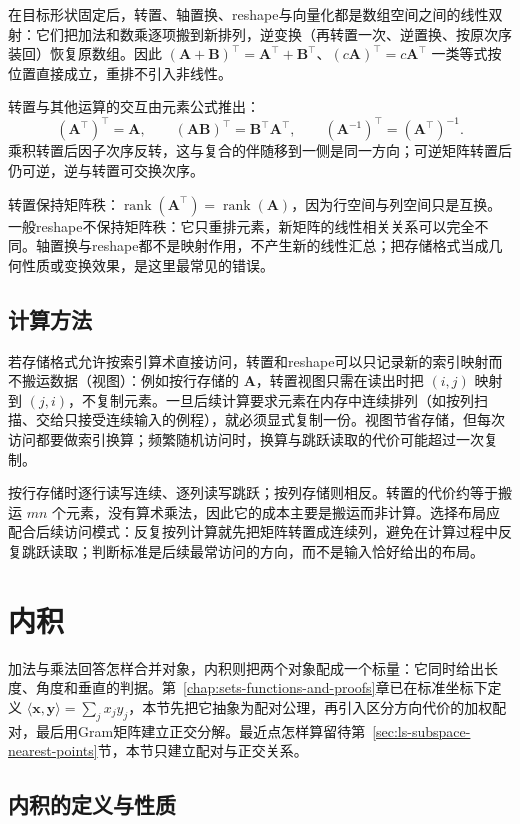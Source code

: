 在目标形状固定后，转置、轴置换、reshape与向量化都是数组空间之间的线性双射：它们把加法和数乘逐项搬到新排列，逆变换（再转置一次、逆置换、按原次序装回）恢复原数组。因此 $(\bm A+\bm B)^\top=\bm A^\top+\bm B^\top$、$(c\bm A)^\top=c\bm A^\top$ 一类等式按位置直接成立，重排不引入非线性。

转置与其他运算的交互由元素公式推出：
\[
 (\bm A^\top)^\top=\bm A,\qquad
 (\bm A\bm B)^\top=\bm B^\top\bm A^\top,\qquad
 (\bm A^{-1})^\top=(\bm A^\top)^{-1}.
\]
乘积转置后因子次序反转，这与复合的伴随移到一侧是同一方向；可逆矩阵转置后仍可逆，逆与转置可交换次序。

转置保持矩阵秩：$\operatorname{rank}(\bm A^\top)=\operatorname{rank}(\bm A)$，因为行空间与列空间只是互换。一般reshape不保持矩阵秩：它只重排元素，新矩阵的线性相关关系可以完全不同。轴置换与reshape都不是映射作用，不产生新的线性汇总；把存储格式当成几何性质或变换效果，是这里最常见的错误。

\subsection{计算方法}

若存储格式允许按索引算术直接访问，转置和reshape可以只记录新的索引映射而不搬运数据（视图）：例如按行存储的 $\bm A$，转置视图只需在读出时把 $(i,j)$ 映射到 $(j,i)$，不复制元素。一旦后续计算要求元素在内存中连续排列（如按列扫描、交给只接受连续输入的例程），就必须显式复制一份。视图节省存储，但每次访问都要做索引换算；频繁随机访问时，换算与跳跃读取的代价可能超过一次复制。

按行存储时逐行读写连续、逐列读写跳跃；按列存储则相反。转置的代价约等于搬运 $mn$ 个元素，没有算术乘法，因此它的成本主要是搬运而非计算。选择布局应配合后续访问模式：反复按列计算就先把矩阵转置成连续列，避免在计算过程中反复跳跃读取；判断标准是后续最常访问的方向，而不是输入恰好给出的布局。

\section{内积}
\label{sec:ls-inner-products}

加法与乘法回答怎样合并对象，内积则把两个对象配成一个标量：它同时给出长度、角度和垂直的判据。第~\ref{chap:sets-functions-and-proofs}章已在标准坐标下定义 $\langle\bm x,\bm y\rangle=\sum_j x_jy_j$，本节先把它抽象为配对公理，再引入区分方向代价的加权配对，最后用Gram矩阵建立正交分解。最近点怎样算留待第~\ref{sec:ls-subspace-nearest-points}节，本节只建立配对与正交关系。

\subsection{内积的定义与性质}

